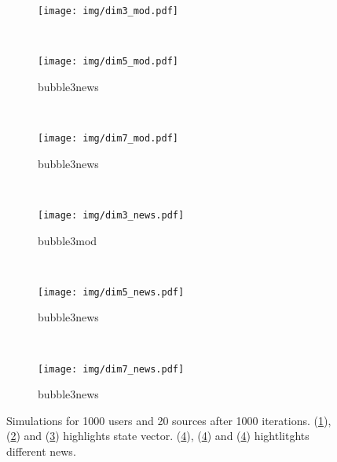 \begin{figure}

  \centering
  \begin{subfigure}[t]{0.25\textwidth}
    \texttt{[image: img/dim3\_mod.pdf]}
    \label{fig:bubble3mod}
    \caption{}
  \end{subfigure}
  ~
  \begin{subfigure}[t]{0.35\textwidth}
    \texttt{[image: img/dim5\_mod.pdf]}
    \label{fig:bubble5mod}
    \caption{bubble3news}
  \end{subfigure}
  ~
  \begin{subfigure}[t]{0.35\textwidth}
    \texttt{[image: img/dim7\_mod.pdf]}
    \label{fig:bubble7mod}
    \caption{bubble3news}
  \end{subfigure}
  \\
  \begin{subfigure}[t]{0.25\textwidth}
    \texttt{[image: img/dim3\_news.pdf]}
    \label{fig:bubble3news}
    \caption{bubble3mod}
  \end{subfigure}
  ~
  \begin{subfigure}[t]{0.35\textwidth}
    \texttt{[image: img/dim5\_news.pdf]}
    \label{fig:bubble5news}
    \caption{bubble3news}
  \end{subfigure}
  ~
  \begin{subfigure}[t]{0.35\textwidth}
    \texttt{[image: img/dim7\_news.pdf]}
    \label{fig:bubble5news}
    \caption{bubble3news}
  \end{subfigure}
  \caption{Simulations for 1000 users and 20 sources after 1000
    iterations. (\ref{fig:bubble3mod}), (\ref{fig:bubble5mod}) and
    (\ref{fig:bubble7mod}) highlights state vector.
    (\ref{fig:bubble3news}), (\ref{fig:bubble3news}) and
    (\ref{fig:bubble3news}) hightlitghts different news.
}
  \label{fig:test}
\end{figure}
